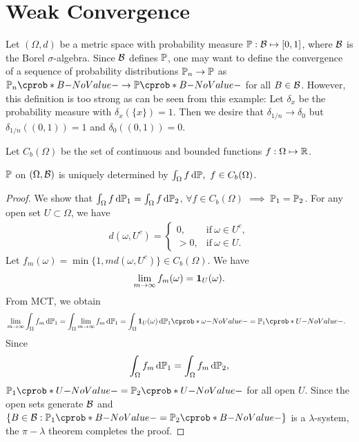 \documentclass[12pt]{article}
\begin{document}

\section{Weak Convergence}
Let $\left(\Omega, d\right)$ be a metric space with probability measure $\P: \calB \mapsto \left[0, 1\right]$, where $\mathcal{B}$ is the Borel $\sigma$-algebra. Since $\mathcal{B}$ defines $\P$, one may want to define the convergence of a sequence of probability distributions $\P_n \to \P$ as $\P_n(B)\to\P(B)$ for all $B\in\mathcal{B}$. However, this definition is too strong as can be seen from this example: Let $\delta_x$ be the probability measure with $\delta_x(\{x\})=1$. Then we desire that $\delta_{1/n} \to \delta_0$ but $\delta_{1/n}((0,1))=1$ and $\delta_0((0,1))=0$.
 
Let $C_b(\Omega)$ be the set of continuous and bounded functions $f: \Omega \mapsto \mathbb{R}$. 
\begin{Lemma}
$\P$ on $\left(\Omega, \mathcal{B}\right)$ is uniquely determined by $\int_{\Omega} f \ud\P, \ f\in C_b(\Omega)$.
\end{Lemma}
\begin{proof}
We show that $\int_{\Omega} f \ud\P_1 = \int_{\Omega} f \ud\P_2$, $\forall f\in C_b(\Omega)$ $\implies \P_1 = \P_2$. For any open set $U \subset \Omega$, we have
\begin{align*}
d(\omega, U^c) = 
\begin{cases} 
0, & \text{if} \ \omega \in U^c, \\ 
> 0, & \text{if}\ \omega \in U. 
\end{cases}
\end{align*}
Let 
$f_m(\omega) = \min \big\{1, m d(\omega, U^c)\big\}\in C_b(\Omega)$. We have 
\begin{align*}
\lim_{m \to \infty} f_m(\omega) = {\bf 1}_{U}(\omega).
\end{align*}
From MCT, we obtain
\begin{align*}
&\lim_{m \to \infty} \int_{\Omega} f_m \ud\P_1
= \int_{\Omega} \lim_{m \to \infty} f_m \ud\P_1
= \int_{\Omega} \indicatore{U}(\omega) \ud\P_1(\omega)
= \P_1(U).
\end{align*}
Since
\begin{align*}
\int_{\Omega} f_m \ud\P_1 = \int_{\Omega} f_m \ud\P_2,
\end{align*}
$\P_1(U) = \P_2(U)$ for all open $U$. Since the open sets generate $\mathcal{B}$ and $\{B\in\calB : \P_1(B)=\P_2(B)\}$ is a $\lambda$-system, the $\pi-\lambda$ theorem completes the proof.
\end{proof}
\end{document}
